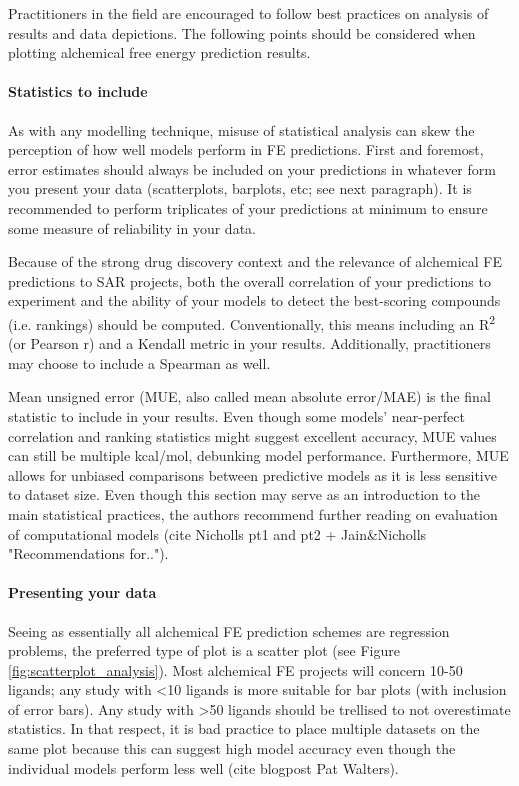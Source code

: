 \documentclass[9pt,bestpractices]{livecoms}
\begin{document}
Practitioners in the field are encouraged to follow best practices on analysis of results and data depictions. The following points should be considered when plotting alchemical free energy prediction results.
\paragraph{Statistics to include}
As with any modelling technique, misuse of statistical analysis can skew the perception of how well models perform in FE predictions. First and foremost, error estimates should always be included on your predictions in whatever form you present your data (scatterplots, barplots, etc; see next paragraph). It is recommended to perform triplicates of your predictions at minimum to ensure some measure of reliability in your data.

Because of the strong drug discovery context and the relevance of alchemical FE predictions to SAR projects, both the overall correlation of your predictions to experiment and the ability of your models to detect the best-scoring compounds (i.e. rankings) should be computed. Conventionally, this means including an R\textsuperscript{2} (or Pearson r) and a Kendall \texttau{} metric in your results. Additionally, practitioners may choose to include a Spearman \textrho{} as well. 

Mean unsigned error (MUE, also called mean absolute error/MAE) is the final statistic to include in your results. Even though some models' near-perfect correlation and ranking statistics might suggest excellent accuracy, MUE values can still be multiple kcal/mol, debunking model performance. Furthermore, MUE allows for unbiased comparisons between predictive models as it is less sensitive to dataset size. Even though this section may serve as an introduction to the main statistical practices, the authors recommend further reading on evaluation of computational models (cite Nicholls pt1 and pt2 + Jain&Nicholls "Recommendations for..").

\paragraph{Presenting your data}
Seeing as essentially all alchemical FE prediction schemes are regression problems, the preferred type of plot is a scatter plot (see Figure \ref{fig:scatterplot_analysis}). Most alchemical FE projects will concern 10-50 ligands; any study with \textless10 ligands is more suitable for bar plots (with inclusion of error bars). Any study with \textgreater50 ligands should be trellised to not overestimate statistics. In that respect, it is bad practice to place multiple datasets on the same plot because this can suggest high model accuracy even though the individual models perform less well (cite blogpost Pat Walters).
\end{document}
